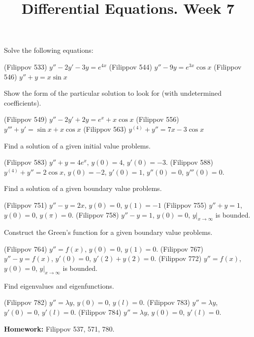 \documentclass[14pt]{exam}
\title{Differential Equations. Week 7}
\date{}
\begin{document}
	\maketitle
	
	Solve the following equations:
	\begin{questions}
		\question (Filippov 533) $y'' - 2y' - 3y = e^{4x}$
		\question (Filippov 544) $y'' - 9y = e^{3x}\cos x$
		\question (Filippov 546) $y'' + y = x\sin x$
	\end{questions}
	
	Show the form of the particular solution to look for (with undetermined coefficients).
	\begin{questions}
		\setcounter{question}{3}
		\question (Filippov 549) $y'' - 2y' + 2y = e^x + x\cos x$
		\question (Filippov 556) $y''' + y' = \sin x + x\cos x$
		\question (Filippov 563) $y^{(4)} + y'' = 7x -3 \cos x$
	\end{questions}
	
	Find a solution of a given initial value problems.
	\begin{questions}
		\setcounter{question}{6}
		\question (Filippov 583) $y'' + y = 4e^x$, $y(0) = 4$, $y'(0) = -3$.
		\question (Filippov 588) $y^{(4)} + y'' = 2\cos x$, $y(0) = -2$, $y'(0) = 1$, $y''(0) = 0$, $y'''(0) = 0$.
	\end{questions}
	
	Find a solution of a given boundary value problems.
	\begin{questions}
		\setcounter{question}{8}
		\question (Filippov 751) $y'' - y = 2x$, $y(0) = 0$, $y(1) = -1$
		\question (Filippov 755) $y'' + y = 1$, $y(0) = 0$, $y(\pi) = 0$.
		\question (Filippov 758) $y'' - y = 1$, $y(0) = 0$, $y|_{x\to\infty}$ is bounded.
	\end{questions}
	
	Construct the Green's function for a given boundary value problems.
	\begin{questions}
		\setcounter{question}{11}
		\question (Filippov 764) $y'' = f(x)$, $y(0) = 0$, $y(1) = 0$.
		\question (Filippov 767) $y'' - y = f(x)$, $y'(0) = 0$, $y'(2) + y(2) = 0$.
		\question  (Filippov 772) $y'' = f(x)$, $y(0) = 0$, $y |_{x\to\infty}$ is bounded.
	\end{questions}
	
	Find eigenvalues and eigenfunctions.
	\begin{questions}
		\setcounter{question}{14}
		\question (Filippov 782) $y'' = \lambda y$, $y(0) = 0$, $y(l) = 0$.
		\question (Filippov 783) $y'' = \lambda y$, $y'(0) = 0$, $y'(l) = 0$.
		\question (Filippov 784) $y'' = \lambda y$, $y(0) = 0$, $y'(l) = 0$.
	\end{questions}
	\textbf{Homework:} Filippov 537, 571, 780.
\end{document}
